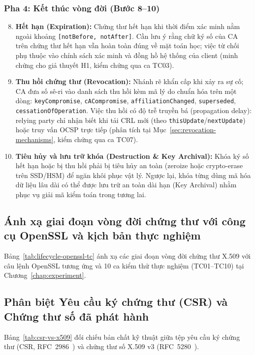 \subsubsection*{Pha 4: Kết thúc vòng đời (Bước 8--10)}
\begin{enumerate}
    \setcounter{enumi}{7}
    \item \textbf{Hết hạn (Expiration):} Chứng thư hết hạn khi thời điểm xác minh nằm ngoài khoảng \texttt{[notBefore, notAfter]}. Cần lưu ý rằng chữ ký số của CA trên chứng thư hết hạn vẫn hoàn toàn đúng về mặt toán học; việc từ chối phụ thuộc vào chính sách xác minh và đồng hồ hệ thống của client (minh chứng cho giả thuyết H1, kiểm chứng qua ca TC03).
    \item \textbf{Thu hồi chứng thư (Revocation):} Nhánh rẽ khẩn cấp khi xảy ra sự cố; CA đưa số sê-ri vào danh sách thu hồi kèm mã lý do chuẩn hóa trên một dòng: \texttt{keyCompromise}, \texttt{cACompromise}, \texttt{affiliationChanged}, \texttt{superseded}, \texttt{cessationOfOperation}. Việc thu hồi có độ trễ truyền bá (propagation delay): relying party chỉ nhận biết khi tải CRL mới (theo \texttt{thisUpdate}/\texttt{nextUpdate}) hoặc truy vấn OCSP trực tiếp (phân tích tại Mục~\ref{sec:revocation-mechanisms}, kiểm chứng qua ca TC07).
    \item \textbf{Tiêu hủy và lưu trữ khóa (Destruction \& Key Archival):} Khóa ký số hết hạn hoặc bị thu hồi phải bị tiêu hủy an toàn (zeroize hoặc crypto-erase trên SSD/HSM) để ngăn khôi phục vật lý. Ngược lại, khóa từng dùng mã hóa dữ liệu lâu dài có thể được lưu trữ an toàn dài hạn (Key Archival) nhằm phục vụ giải mã kiểm toán trong tương lai.
\end{enumerate}

\subsection{Ánh xạ giai đoạn vòng đời chứng thư với công cụ OpenSSL và kịch bản thực nghiệm}
Bảng~\ref{tab:lifecycle-openssl-tc} ánh xạ các giai đoạn vòng đời chứng thư X.509 với câu lệnh OpenSSL tương ứng và 10 ca kiểm thử thực nghiệm (TC01--TC10) tại Chương~\ref{chap:experiment}.



\subsection{Phân biệt Yêu cầu ký chứng thư (CSR) và Chứng thư số đã phát hành}
\label{subsec:csr-vs-cert}
Bảng~\ref{tab:csr-vs-x509} đối chiếu bản chất kỹ thuật giữa tệp yêu cầu ký chứng thư (CSR, RFC~2986~\cite{rfc2986}) và chứng thư số X.509 v3 (RFC~5280~\cite{rfc5280}).

